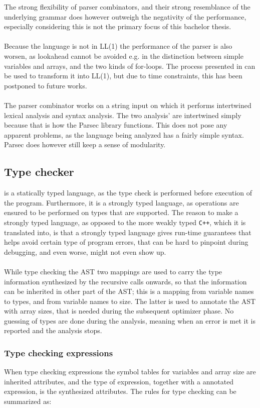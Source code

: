 The strong flexibility of parser combinators, and their strong resemblance of the underlying
grammar does however outweigh the negativity of the performance, especially considering this is
not the primary focus of this bachelor thesis.
\\
\\
Because the language is not in LL(1) the performance of the parser is also worsen, as lookahead
cannot be avoided e.g. in the distinction between simple variables and arrays, and the two
kinds of for-loops. The process presented in \cite{torben} can be used to transform it into
LL(1), but due to time constraints, this has been postponed to future works.
\\
\\
The parser combinator works on a string input on which it performs intertwined lexical analysis
and syntax analysis. The two analysis' are intertwined simply because that is how the Parsec
library functions. This does not pose any apparent problems, as the language being analyzed has
a fairly simple syntax. Parsec does however still keep a sense of modularity.

\subsection{Type checker}
\lan is a statically typed language, as the type check is performed before execution of the program.
Furthermore, it is a strongly typed language, as operations are ensured to be performed on
types that are supported. The reason to make \lan a strongly typed language, as opposed to
the more weakly typed \texttt{C++}, which it is translated into, is that a strongly typed
language gives run-time guarantees that helps avoid certain type of program errors, that can be
hard to pinpoint during debugging, and even worse, might not even show up.
\\
\\
While type checking the AST two mappings are used to carry the type information synthesized by the
recursive calls onwards, so that the information can be inherited in other part of the AST; this
is a mapping from variable names to types, and from variable names to size. The latter is used
to annotate the AST with array sizes, that is needed during the subsequent optimizer phase.
No guessing of types are done during the analysis, meaning when an error is met it is reported
and the analysis stops.

\subsubsection{Type checking expressions}
When type checking expressions the symbol tables for variables and array size are inherited
attributes, and the type of expression, together with a annotated expression,
is the synthesized attributes. The rules for type checking
can be summarized as:

